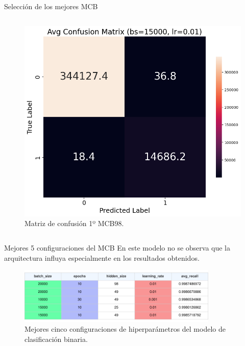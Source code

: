 \begin{frame}{Selección de los mejores MCB}
\begin{columns}[b]
\begin{column}{0.3\textwidth}
\begin{figure}[H]
    \centering
    \includegraphics[width=1\textwidth]{../Memoria/img/modelo/matrices_confusion/MC_ENT_MCB98.png}
    \caption{Matriz de confusión 1º MCB98.}
    \label{fig:MC_ENT_MCB98}
\end{figure}

\end{column}
\end{columns}
\end{frame}


\begin{frame}{Mejores 5 configuraciones del MCB}
En este modelo no se observa que la arquitectura influya especialmente en los resultados obtenidos.
\begin{figure}[H]
    \centering
    \includegraphics[width=0.85\textwidth]{../Memoria/img/modelo/resultados/BINtop5.pdf}
    \caption{Mejores cinco configuraciones de hiperparámetros del modelo de clasificación binaria.}
    \label{fig:BINtop5}
\end{figure}

\end{frame}




